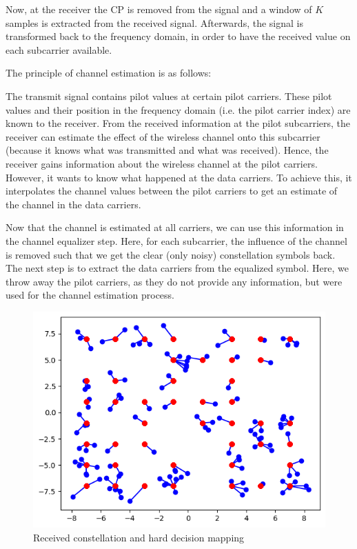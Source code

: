 Now, at the receiver the CP is removed from the signal and a window of $K$ samples is extracted from the received signal. Afterwards, the signal is transformed back to the frequency domain, in order to have the received value on each subcarrier available.

The principle of channel estimation is as follows:

The transmit signal contains pilot values at certain pilot carriers. These pilot values and their position in the frequency domain (i.e. the pilot carrier index) are known to the receiver. From the received information at the pilot subcarriers, the receiver can estimate the effect of the wireless channel onto this subcarrier (because it knows what was transmitted and what was received). Hence, the receiver gains information about the wireless channel at the pilot carriers. However, it wants to know what happened at the data carriers. To achieve this, it interpolates the channel values between the pilot carriers to get an estimate of the channel in the data carriers.

Now that the channel is estimated at all carriers, we can use this information in the channel equalizer step. Here, for each subcarrier, the influence of the channel is removed such that we get the clear (only noisy) constellation symbols back. The next step is to extract the data carriers from the equalized symbol. Here, we throw away the pilot carriers, as they do not provide any information, but were used for the channel estimation process.

\begin{figure}[htbp]
    \centering
    \includegraphics[width=0.7\linewidth]{../Source/results/Received-constellation.png}
    \caption{Received constellation and hard decision mapping}
    \label{received}
\end{figure}


